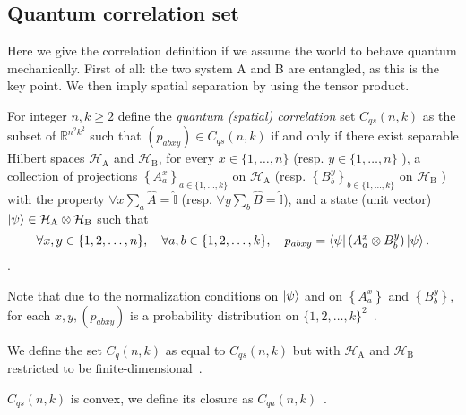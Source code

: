 \subsection{Quantum correlation set}
Here we give the correlation definition if we assume the world to behave quantum mechanically. First of all: the two system A and B are entangled, as this is the key point. We then imply spatial separation by using the tensor product.


\begin{defn}\label{defn:quantum-correlation-set}
    For integer $n, k \geq 2$ define the \emph{quantum (spatial) correlation} set $C_{q s}(n, k)$ as the subset of $\mathbb{R}^{n^{2} k^{2}}$ such that $\left(p_{a b x y}\right) \in C_{q s}(n, k)$ if and only if there exist separable Hilbert spaces $\mathcal{H}_{\mathrm{A}}$ and $\mathcal{H}_{\mathrm{B}}$, for every $x \in\{1, \ldots, n\}$ (resp. $y \in\{1, \ldots, n\}$ ), a collection of projections $\left\{A_{a}^{x}\right\}_{a \in\{1, \ldots, k\}}$ on $\mathcal{H}_{\mathrm{A}}$ (resp. $\left\{B_{b}^{y}\right\}_{b \in\{1, \ldots, k\}}$ on $\mathcal{H}_{\mathrm{B}}$ ) with the property $\forall x \sum_a{\hat{A}} = \hat{\mathbb{I}}$ (resp. $\forall y \sum_b{\hat{B}} = \hat{\mathbb{I}}$), and a state (unit vector) $\ket{\psi} \in \mathcal{H}_{\mathrm{A}} \otimes \mathcal{H}_{\mathrm{B}}$ such that
    \begin{equation}
    \forall x, y \in\{1,2, \ldots, n\}, \quad \forall a, b \in\{1,2, \ldots, k\}, \quad p_{a b x y}=\bra{\psi}\left(A_{a}^{x} \otimes B_{b}^{y}\right) \ket{\psi} .
    \end{equation}.
\end{defn}

Note that due to the normalization conditions on $\ket{\psi}$ and on $\left\{A_{a}^{x}\right\}$ and $\left\{B_{b}^{y}\right\}$, for each $x, y,\left(p_{a b x y}\right)$ is a probability distribution on $\{1,2, \ldots, k\}^{2}$~\cite{mipre}.

\begin{defn}
We define the set $C_{q}(n, k)$ as equal to $C_{q s}(n, k)$ but with $\mathcal{H}_{\mathrm{A}}$ and $\mathcal{H}_{\mathrm{B}}$ restricted to be finite-dimensional~\cite{mipre}.
\end{defn}

\begin{defn}
    $C_{q s}(n, k)$ is convex, we define its closure as $C_{q a}(n, k)$~\cite{mipre}.
\end{defn}

